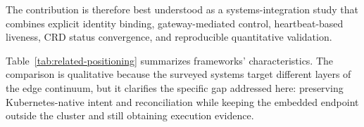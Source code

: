  The contribution is therefore best understood as a systems-integration study that combines explicit identity binding, gateway-mediated control, heartbeat-based liveness, CRD status convergence, and reproducible quantitative validation.

\begingroup
\color{red}
Table~\ref{tab:related-positioning} summarizes frameworks' characteristics. The comparison is qualitative because the surveyed systems target different layers of the edge continuum, but it clarifies the specific gap addressed here: preserving Kubernetes-native intent and reconciliation while keeping the embedded endpoint outside the cluster and still obtaining execution evidence.

